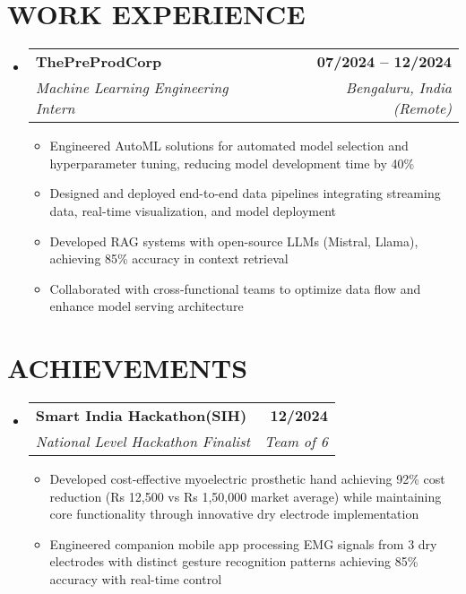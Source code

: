 \documentclass[letterpaper,8pt]{article}
\makeatletter
\newcommand{\resumeItem}[1]{
  \item\small{
    {#1 \vspace{-1pt}}
  }
}
\newcommand{\resumeSubheading}[4]{
  \vspace{-2pt}\item
    \begin{tabular*}{1.0\textwidth}[t]{l@{\extracolsep{\fill}}r}
      \textbf{\normalsize#1} & \textbf{\small #2} \\
      \textit{\normalsize#3} & \textit{\small #4} \\
    \end{tabular*}\vspace{-7pt}
}
\newcommand{\resumeSubHeadingListStart}{\begin{itemize}[leftmargin=0.0in, label={}]}
\newcommand{\resumeSubHeadingListEnd}{\end{itemize}}
\newcommand{\resumeItemListStart}{\begin{itemize}[leftmargin=0.1in]}
\newcommand{\resumeItemListEnd}{\end{itemize}\vspace{-5pt}}
\makeatother
\begin{document}
\section{\textcolor{airforceblue}{WORK EXPERIENCE}}
\resumeSubHeadingListStart
    \resumeSubheading
      {ThePreProdCorp}{07/2024 -- 12/2024}
      {Machine Learning Engineering Intern}{Bengaluru, India (Remote)}
      \resumeItemListStart
        \resumeItem{Engineered AutoML solutions for automated model selection and hyperparameter tuning, reducing model development time by 40\%}
        \resumeItem{Designed and deployed end-to-end data pipelines integrating streaming data, real-time visualization, and model deployment}
        \resumeItem{Developed RAG systems with open-source LLMs (Mistral, Llama), achieving 85\% accuracy in context retrieval}
        \resumeItem{Collaborated with cross-functional teams to optimize data flow and enhance model serving architecture}
      \resumeItemListEnd
\resumeSubHeadingListEnd



\section{\textcolor{airforceblue}{ACHIEVEMENTS}}
\resumeSubHeadingListStart
    \resumeSubheading
      {Smart India Hackathon(SIH)}{12/2024}
      {National Level Hackathon Finalist}{Team of 6}
      \resumeItemListStart
        \resumeItem{Developed cost-effective myoelectric prosthetic hand achieving 92\% cost reduction (Rs 12,500 vs Rs 1,50,000 market average) while maintaining core functionality through innovative dry electrode implementation}
        \resumeItem{Engineered companion mobile app processing EMG signals from 3 dry electrodes with distinct gesture recognition patterns achieving 85\% accuracy with real-time control}
      \resumeItemListEnd
\resumeSubHeadingListEnd
\end{document}
